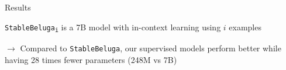 \documentclass[10pt]{beamer}
\begin{document}
\begin{frame}{Results}

\texttt{StableBeluga\textsubscript{i}} is a 7B model with in-context learning using $i$ examples

\begin{table}
    \centering
\caption{$F_1$-scores for character and emotion detection. Significant differences from \texttt{baseline}: ** ($p<0.01$), * ($p<0.05$).}
    \label{tab:result}
\end{table}

\vspace{0.25cm}
\pause

$\rightarrow$ Compared to \texttt{StableBeluga}, our supervised models perform better while having 28 times fewer parameters (248M vs 7B)
    
\end{frame}
\end{document}
